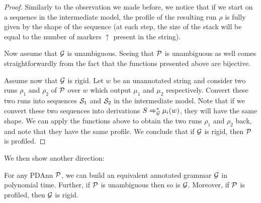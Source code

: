 \begin{proof}
Similarly to the observation we made before, we notice that if we start on a sequence in the intermediate model, the profile of the resulting run $\rho$ is fully given by the shape of the sequence (at each step, the size of the stack will be equal to the number of markers $\uparrow$ present in the string).

Now assume that $\mathcal{G}$ is unambiguous. Seeing that $\mathcal{P}$ is unambiguous as well comes straightforwardly from the fact that the functions presented above are bijective.

Assume now that $\mathcal{G}$ is rigid. Let $w$ be an unannotated string and consider two runs $\rho_1$ and $\rho_2$ of $\mathcal{P}$ over $w$ which output $\mu_1$ and $\mu_2$ respectively. Convert these two runs into sequences $\mathcal{S}_1$ and $\mathcal{S}_2$ in the intermediate model. Note that if we convert these two sequences into derivations $S\Rightarrow_{\mathcal{G}}^*\mu_i(w)$, they will have the same shape. We can apply the functions above to obtain the two runs $\rho_1$ and $\rho_2$ back, and note that they have the same profile. We conclude that if $\mathcal{G}$ is rigid, then $\mathcal{P}$ is profiled.
\end{proof}

We then show another direction:

\begin{proposition}
	\label{prp:pdt2g}
	For any PDAnn $\mathcal{P}$, we can build an equivalent annotated grammar $\mathcal{G}$ in polynomial
	time. Further, if $\mathcal{P}$ is unambiguous then so is $\mathcal{G}$. Moreover, if $\mathcal{P}$ is profiled, then $\mathcal{G}$ is rigid.
\end{proposition}

